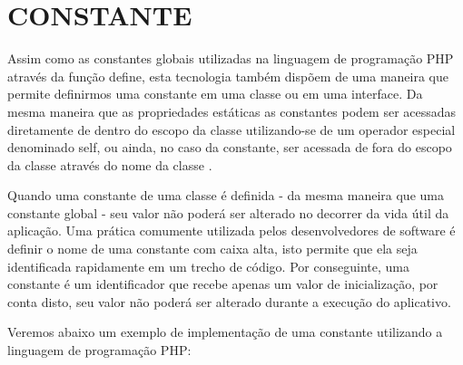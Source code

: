 \section{CONSTANTE}

Assim como as constantes globais utilizadas na linguagem de programação PHP 
através da função define, esta tecnologia também dispõem de uma maneira que 
permite definirmos uma constante em uma classe ou em uma interface. Da mesma 
maneira que as propriedades estáticas as constantes podem ser acessadas 
diretamente de dentro do escopo da classe utilizando-se de um operador especial 
denominado self, ou ainda, no caso da constante, ser acessada de fora do escopo 
da classe através do nome da classe  \cite{programmingPhp}.

Quando uma constante de uma classe é definida - da mesma maneira que uma 
constante global -  seu valor não poderá ser alterado no decorrer da vida útil 
da aplicação. Uma prática comumente utilizada pelos desenvolvedores de software 
é definir o nome de uma constante com caixa alta, isto permite que ela seja 
identificada rapidamente em um trecho de código. Por conseguinte, uma constante 
é um identificador que recebe apenas um valor de inicialização, por conta disto,
seu valor não poderá ser alterado durante a execução do aplicativo.

Veremos abaixo um exemplo de implementação de uma constante utilizando a 
linguagem de programação PHP: